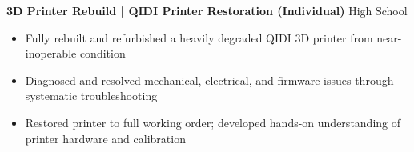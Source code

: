 \noindent
\textbf{3D Printer Rebuild | QIDI Printer Restoration (Individual)} \hfill High School
\begin{itemize}
    \item Fully rebuilt and refurbished a heavily degraded QIDI 3D printer from near-inoperable condition
    \item Diagnosed and resolved mechanical, electrical, and firmware issues through systematic troubleshooting
    \item Restored printer to full working order; developed hands-on understanding of printer hardware and calibration
\end{itemize}
